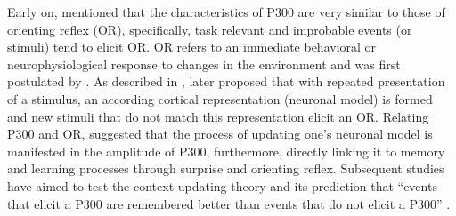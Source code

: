 Early on, \textcite{donchinSurpriseSurprise1981} mentioned that the characteristics of P300 are very similar to those of orienting reflex (OR), specifically, task relevant and improbable events (or stimuli) tend to elicit OR. OR refers to an immediate behavioral or neurophysiological response to changes in the environment and was first postulated by \textcite{pavlovConditionedReflexesInvestigation1927}. As described in \textcite{rushbySeparationComponentsLate2005}, \textcite{sokolovPerceptionConditionedReflex1963} later proposed that with repeated presentation of a stimulus, an according cortical representation (neuronal model) is formed and new stimuli that do not match this representation elicit an OR. Relating P300 and OR, \textcite{donchinSurpriseSurprise1981} suggested that the process of updating one’s neuronal model is manifested in the amplitude of P300, furthermore, directly linking it to memory and learning processes through surprise and orienting reflex. Subsequent studies have aimed to test the context updating theory and its prediction that “events that elicit a P300 are remembered better than events that do not elicit a P300” \textcite[page. 509]{donchinSurpriseSurprise1981}.

